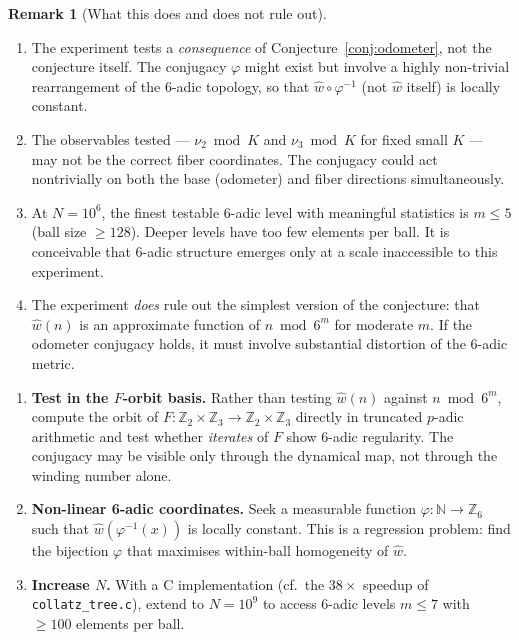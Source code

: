 \documentclass[11pt,a4paper]{article}
\newcommand{\Z}{\mathbb{Z}}
\newcommand{\N}{\mathbb{N}}
\theoremstyle{plain}
\theoremstyle{definition}
\newtheorem{remark}[theorem]{Remark}
\begin{document}
\begin{remark}[What this does and does not rule out]
    \begin{enumerate}
        \item The experiment tests a \emph{consequence} of
        Conjecture~\ref{conj:odometer}, not the conjecture itself.
        The conjugacy $\varphi$ might exist but involve a highly
        non-trivial rearrangement of the 6-adic topology, so that
        $\hat{w} \circ \varphi^{-1}$ (not $\hat{w}$ itself) is
        locally constant.

        \item The observables tested --- $\nu_2 \bmod K$ and
        $\nu_3 \bmod K$ for fixed small $K$ --- may not be the
        correct fiber coordinates.  The conjugacy could act
        nontrivially on both the base (odometer) and fiber
        directions simultaneously.

        \item At $N = 10^6$, the finest testable 6-adic level with
        meaningful statistics is $m \leq 5$ (ball size $\geq 128$).
        Deeper levels have too few elements per ball.  It is
        conceivable that 6-adic structure emerges only at a scale
        inaccessible to this experiment.

        \item The experiment \emph{does} rule out the simplest
        version of the conjecture: that $\hat{w}(n)$ is
        an approximate function of $n \bmod 6^m$ for moderate $m$.
        If the odometer conjugacy holds, it must involve substantial
        distortion of the 6-adic metric.
    \end{enumerate}
\end{remark}

\begin{nextstep}
    \begin{enumerate}
        \item \textbf{Test in the $F$-orbit basis.}
        Rather than testing $\hat{w}(n)$ against $n \bmod 6^m$, compute
        the orbit of $F: \Z_2 \times \Z_3 \to \Z_2 \times \Z_3$
        directly in truncated $p$-adic arithmetic and test whether
        \emph{iterates} of $F$ show 6-adic regularity.  The conjugacy
        may be visible only through the dynamical map, not through the
        winding number alone.

        \item \textbf{Non-linear 6-adic coordinates.}
        Seek a measurable function $\varphi: \N \to \Z_6$ such that
        $\hat{w}(\varphi^{-1}(x))$ is locally constant.  This is a
        regression problem: find the bijection $\varphi$ that maximises
        within-ball homogeneity of $\hat{w}$.

        \item \textbf{Increase $N$.}  With a C implementation
        (cf.\ the $38\times$ speedup of \texttt{collatz\_tree.c}),
        extend to $N = 10^9$ to access 6-adic levels $m \leq 7$
        with $\geq 100$ elements per ball.
    \end{enumerate}
\end{nextstep}
\end{document}
